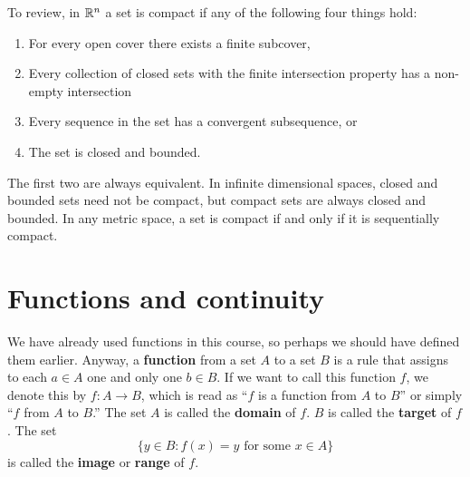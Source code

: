 To review, in $\mathbb{R}^n$ a set is compact if any of the following four
things hold:
\begin{enumerate}
\item For every open cover there exists a finite subcover,
\item Every collection of closed sets with the finite intersection
  property has a non-empty intersection
\item Every sequence in the set has a convergent subsequence, or
\item The set is closed and bounded.
\end{enumerate}
The first two are always equivalent. 
In infinite dimensional spaces, closed and bounded sets need not be
compact, but compact sets are always closed and bounded. In any metric
space, a set is compact if and only if it is sequentially compact. 

\section{Functions and continuity}

We have already used functions in this course, so perhaps we should
have defined them earlier. Anyway, a \textbf{function} from a set $A$
to a set $B$ is a rule that assigns to each $a \in A$ one and only one
$b \in B$. If we want to call this function $f$, we denote this by
$f:A \to B$, which is read as ``$f$ is a function from $A$ to $B$'' or
simply ``$f$ from $A$ to $B$.'' The set $A$ is called the
\textbf{domain} of $f$. $B$ is called the \textbf{target} of $f$. The
set 
\[ \{y  \in B:  f(x) = y \text{ for some } x \in A \} \]
is called the \textbf{image} or \textbf{range} of $f$. 


